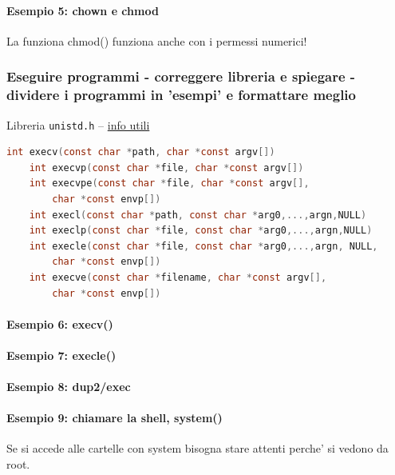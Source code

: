 \paragraph{Esempio 5: chown e chmod}\hfill \break


La funziona chmod() funziona anche con i permessi numerici! 

\subsubsection{Eseguire programmi - correggere libreria e spiegare - dividere i programmi in 'esempi' e formattare meglio}
Libreria \texttt{unistd.h} -- \href{https://linuxhint.com/exec_linux_system_call_c/}{info utili}
\begin{lstlisting}[language=C]
    int execv(const char *path, char *const argv[])
    int execvp(const char *file, char *const argv[])
    int execvpe(const char *file, char *const argv[],
        char *const envp[])
    int execl(const char *path, const char *arg0,...,argn,NULL)
    int execlp(const char *file, const char *arg0,...,argn,NULL)
    int execle(const char *file, const char *arg0,...,argn, NULL,
        char *const envp[])
    int execve(const char *filename, char *const argv[], 
        char *const envp[])
\end{lstlisting}

\paragraph{Esempio 6: execv() }\hfill \break



\paragraph{Esempio 7: execle()} \hfill \break



\paragraph{Esempio 8: dup2/exec}\hfill \break


\paragraph{Esempio 9: chiamare la shell, system()}\hfill \break
Se si accede alle cartelle con system bisogna stare attenti perche' si vedono da root.




